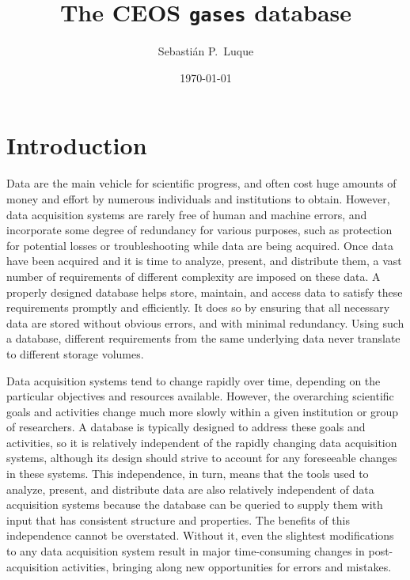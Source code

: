 \documentclass[12pt,letterpaper,titlepage,headings=small,numbers=noenddot]%
{scrartcl}
\begin{document}
\title{\Large \bfseries The CEOS \texttt{gases} database}

\author[1]{Sebastián P.~Luque}


\date{\smaller[2] \today}


\maketitle

\tableofcontents{}

\section{Introduction}
\label{sec:introduction}

Data are the main vehicle for scientific progress, and often cost huge
amounts of money and effort by numerous individuals and institutions to
obtain.  However, data acquisition systems are rarely free of human and
machine errors, and incorporate some degree of redundancy for various
purposes, such as protection for potential losses or troubleshooting while
data are being acquired.  Once data have been acquired and it is time to
analyze, present, and distribute them, a vast number of requirements of
different complexity are imposed on these data.  A properly designed
database helps store, maintain, and access data to satisfy these
requirements promptly and efficiently.  It does so by ensuring that all
necessary data are stored without obvious errors, and with minimal
redundancy.  Using such a database, different requirements from the same
underlying data never translate to different storage volumes.

Data acquisition systems tend to change rapidly over time, depending on the
particular objectives and resources available.  However, the overarching
scientific goals and activities change much more slowly within a given
institution or group of researchers.  A database is typically designed to
address these goals and activities, so it is relatively independent of the
rapidly changing data acquisition systems, although its design should
strive to account for any foreseeable changes in these systems.  This
independence, in turn, means that the tools used to analyze, present, and
distribute data are also relatively independent of data acquisition systems
because the database can be queried to supply them with input that has
consistent structure and properties.  The benefits of this independence
cannot be overstated.  Without it, even the slightest modifications to any
data acquisition system result in major time-consuming changes in
post-acquisition activities, bringing along new opportunities for errors
and mistakes.
\end{document}
